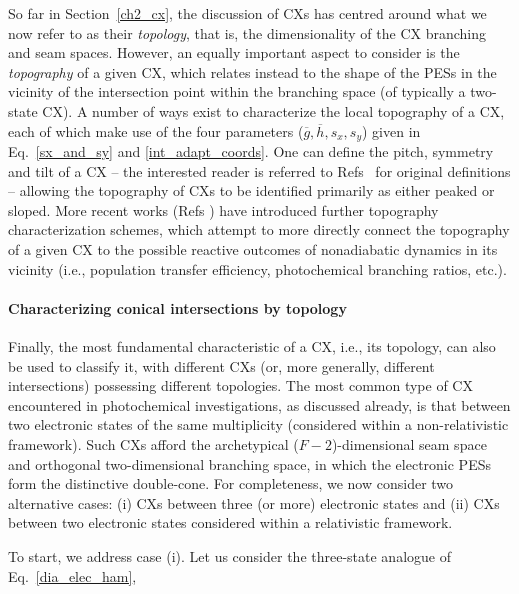 \documentclass[9pt,bestpractices]{livecoms}
\begin{document}
So far in Section~\ref{ch2_cx}, the discussion of CXs has centred around what we now refer to as their \textit{topology}, that is, the dimensionality of the CX branching and seam spaces.
However, an equally important aspect to consider is the \textit{topography} of a given CX,\cite{matsika_electronic_2021, farfan_systematic_2020} which relates instead to the shape of the PESs in the vicinity of the intersection point within the branching space (of typically a two-state CX).
A number of ways exist to characterize the local topography of a CX,\cite{boeije_one-mode_2023, doi:https://doi.org/10.1002/9781119417774.ch1} each of which make use of the four parameters ($\overline{g}, \overline{h}, s_x, s_y$) given in Eq.~\eqref{sx_and_sy} and \eqref{int_adapt_coords}.
One can define the pitch, symmetry and tilt of a CX -- the interested reader is referred to Refs~\cite{yarkony_nuclear_2001,atchity_potential_1991} for original definitions -- allowing the topography of CXs to be identified primarily as either peaked or sloped.
More recent works (Refs \cite{fdez_galvan_analytical_2016, fdez_galvan_role_2022, cuellar2023characterizing}) have introduced further topography characterization schemes, which attempt to more directly connect the topography of a given CX to the possible reactive outcomes of nonadiabatic dynamics in its vicinity (i.e., population transfer efficiency, photochemical branching ratios, etc.).\cite{wang2025minimum}

\paragraph{Characterizing conical intersections by topology}
\label{ch2_topol}

Finally, the most fundamental characteristic of a CX, i.e., its topology, can also be used to classify it, with different CXs (or, more generally, different intersections) possessing different topologies.
The most common type of CX encountered in photochemical investigations, as discussed already, is that between two electronic states of the same multiplicity (considered within a non-relativistic framework).
Such CXs afford the archetypical ($F - 2$)-dimensional seam space and orthogonal two-dimensional branching space, in which the electronic PESs form the distinctive double-cone.
For completeness, we now consider two alternative cases: (i) CXs between three (or more) electronic states and (ii) CXs between two electronic states considered within a relativistic framework.

To start, we address case (i). 
Let us consider the three-state analogue of Eq.~\eqref{dia_elec_ham},\cite{matsika_nonadiabatic_2011}
\end{document}
